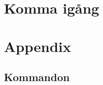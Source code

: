 \pagestyle{plain}

\setcounter{page}{1}
\chapter{Komma igång}\label{sec:intro}


\appendix
\chapter{Appendix}\label{sec:appendix}
        \section{Kommandon}\label{sec:kommandon}
        


